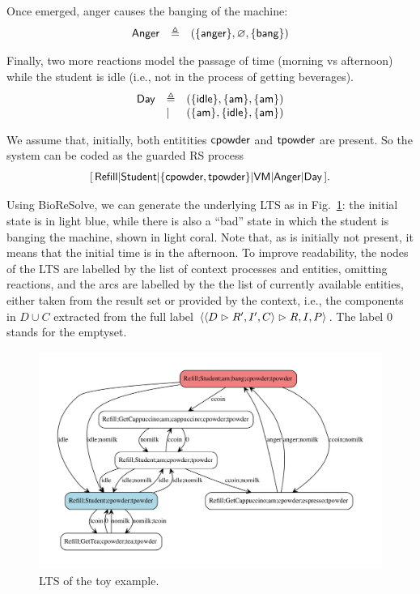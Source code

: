 Once emerged, anger causes the banging of the machine:
\[
\begin{array}{lll}
\mathsf{Anger} & \triangleq & (\{{\text{\sffamily anger}}\},\varnothing,\{{\text{\sffamily bang}}\})
\end{array}
\]

Finally, two more reactions model the passage of time (morning vs afternoon) while the student is idle (i.e., not in the process of getting beverages).
\[
\begin{array}{lll}
\mathsf{Day} & \triangleq & (\{{\text{\sffamily idle}}\},\{{\text{\sffamily am}}\},\{{\text{\sffamily am}}\})\\
& | & (\{{\text{\sffamily am}}\},\{{\text{\sffamily idle}}\},\{{\text{\sffamily am}}\})
\end{array}
\]

We assume that, initially, both entitities ${\text{\sffamily cpowder}}$ and ${\text{\sffamily tpowder}}$ are present.
So the system can be coded as the guarded RS process
\[
[\,\mathsf{Refill}
| \mathsf{Student}
| \{{\text{\sffamily cpowder}},{\text{\sffamily tpowder}}\} 
| \mathsf{VM}
| \mathsf{Anger}
| \mathsf{Day}\,] .
\]


Using BioReSolve, we can generate the underlying LTS as in Fig.~\ref{fig:toylts}: the initial state is in light blue, while there is also a ``bad'' state in which the student is banging the machine, shown in light coral.
Note that, as \am is initially not present, it means that the initial time is in the afternoon.
To improve readability, the nodes of the LTS are labelled by the list of context processes and entities, omitting reactions, and the arcs are labelled by the the list of currently available entities, either taken from the result set or provided by the context, i.e., the components in $D\cup C$ extracted from the full label $\langle \langle D\vartriangleright R',I',C\rangle\vartriangleright R,I,P\rangle$. The label $0$ stands for the emptyset.

\begin{figure}
\includegraphics[scale=.3]{./figs/toylts}
\caption{LTS of the toy example.\label{fig:toylts}}
\end{figure}

